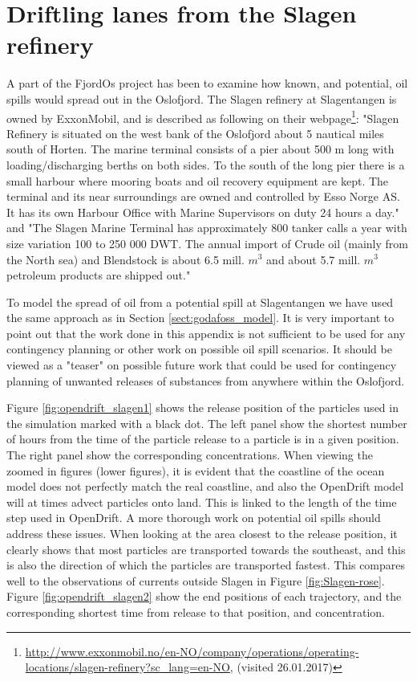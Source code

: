 \section*{\hspace{1.5cm} Driftling lanes from the Slagen refinery}
A part of the FjordOs project has been to examine how known, and potential, oil spills would spread out in the Oslofjord. The Slagen refinery at Slagentangen is owned by ExxonMobil, and is described as following on their webpage\footnote{\url{http://www.exxonmobil.no/en-NO/company/operations/operating-locations/slagen-refinery?sc_lang=en-NO}, (visited 26.01.2017)}: "Slagen Refinery is situated on the west bank of the Oslofjord about 5 nautical miles south of Horten. The marine terminal consists of a pier about 500 m long with loading/discharging berths on both sides. To the south of the long pier there is a small harbour where mooring boats and oil recovery equipment are kept. The terminal and its near surroundings are owned and controlled by Esso Norge AS. It has its own Harbour Office with Marine Supervisors on duty 24 hours a day." and "The Slagen Marine Terminal has approximately 800 tanker calls a year with size variation 100 to 250 000 DWT. The annual import of Crude oil (mainly from the North sea) and Blendstock is about 6.5 mill. $m^3$ and about 5.7 mill. $m^3$ petroleum products are shipped out."

To model the spread of oil from a potential spill at Slagentangen we have used the same approach as in Section \ref{sect:godafoss_model}. It is very important to point out that the work done in this appendix is not sufficient to be used for any contingency planning or other work on possible oil spill scenarios. It should be viewed as a "teaser" on possible future work that could be used for contingency planning of unwanted releases of substances from anywhere within the Oslofjord.

Figure \ref{fig:opendrift_slagen1} shows the release position of the particles used in the simulation marked with a black dot.  The left panel show the shortest number of hours from the time of the particle release to a particle is in a given position. The right panel show the corresponding concentrations. When viewing the zoomed in figures (lower figures), it is evident that the coastline of the ocean model does not perfectly match the real coastline, and also the OpenDrift model will at times advect particles onto land. This is linked to the length of the time step used in OpenDrift. A more thorough work on potential oil spills should address  these issues.
When looking at the area closest to the release position, it clearly shows that most particles are transported towards the southeast, and this is also the direction of which the particles are transported fastest. This compares well to the observations of currents outside Slagen in Figure \ref{fig:Slagen-rose}.
Figure \ref{fig:opendrift_slagen2} show the end positions of each trajectory, and the corresponding shortest time from release to that position, and concentration.

